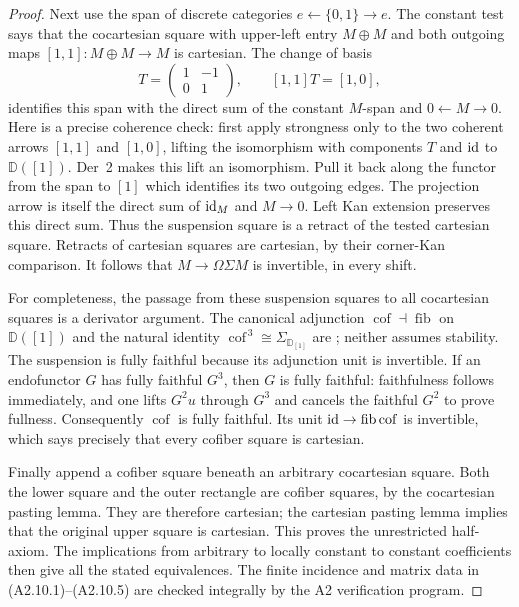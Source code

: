 \begin{proof}
Next use the span of discrete categories $e\leftarrow\{0,1\}\to e$.
The constant test says that the cocartesian square with upper-left entry
$M\oplus M$ and both outgoing maps $[1,1]:M\oplus M\to M$ is cartesian.
The change of basis
\[
 T=\begin{pmatrix}1&-1\\0&1\end{pmatrix},
 \qquad [1,1]T=[1,0],
 \tag{A2.10.5}
\]
identifies this span with the direct sum of the constant $M$-span and
$0\leftarrow M\to0$. Here is a precise coherence check: first apply
strongness only to the two coherent arrows $[1,1]$ and $[1,0]$, lifting
the isomorphism with components $T$ and $\operatorname{id}$ to $\mathbb D([1])$.
Der~2 makes this lift an isomorphism. Pull it back along the functor
from the span to $[1]$ which identifies its two outgoing edges.
The projection arrow is itself the direct sum of $\operatorname{id}_M$ and $M\to0$.
Left Kan extension preserves this direct sum. Thus the suspension square
is a retract of the tested cartesian square. Retracts of cartesian
squares are cartesian, by their corner-Kan comparison. It follows that
$M\to\Omega\Sigma M$ is invertible, in every shift.

For completeness, the passage from these suspension squares to all
cocartesian squares is a derivator argument. The canonical adjunction
$\operatorname{cof}\dashv\operatorname{fib}$ on $\mathbb D([1])$ and the
natural identity
$\operatorname{cof}^{\,3}\cong\Sigma_{\mathbb D_{[1]}}$ are
\cite[Lemmas~5.12--5.13]{A2GrothPontoShulman}; neither assumes stability.
The suspension is fully faithful because its adjunction unit is invertible.
If an endofunctor $G$ has fully faithful $G^3$, then $G$ is fully faithful:
faithfulness follows immediately, and one lifts $G^2u$ through $G^3$
and cancels the faithful $G^2$ to prove fullness. Consequently
$\operatorname{cof}$ is fully faithful. Its unit
$\operatorname{id}\to\operatorname{fib}\operatorname{cof}$ is invertible, which says
precisely that every cofiber square is cartesian.

Finally append a cofiber square beneath an arbitrary cocartesian square.
Both the lower square and the outer rectangle are cofiber squares, by
the cocartesian pasting lemma. They are therefore cartesian; the
cartesian pasting lemma implies that the original upper square is
cartesian. This proves the unrestricted half-axiom. The implications
from arbitrary to locally constant to constant coefficients then give all
the stated equivalences. The finite incidence and matrix data in
(A2.10.1)--(A2.10.5) are checked integrally by the A2 verification program.
\end{proof}

